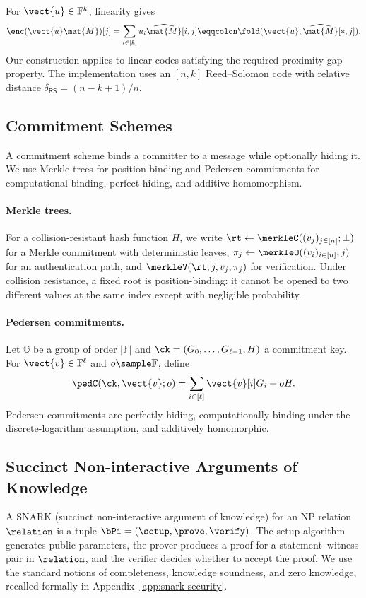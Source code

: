 For $\vect{u}\in\mathbb{F}^k$, linearity gives
\[
  \enc(\vect{u}\mat{M})[j]
  =\sum_{i\in[k]}u_i\widehat{\mat{M}}[i,j]
  \eqqcolon\fold(\vect{u},\widehat{\mat{M}}[*,j]).
\]
Our construction applies to linear codes satisfying the required proximity-gap
property.  The implementation uses an $[n,k]$ Reed--Solomon code with relative
distance $\delta_{\mathsf{RS}}=(n-k+1)/n$.

\subsection{Commitment Schemes}
\label{sec:prelim-commitments}

A commitment scheme binds a committer to a message while optionally hiding it.
We use Merkle trees for position binding and Pedersen commitments for
computational binding, perfect hiding, and additive homomorphism.

\paragraph{Merkle trees.}
For a collision-resistant hash function $H$, we write
$\rt\gets\merkleC((v_j)_{j\in[n]};\bot)$ for a Merkle commitment with
deterministic leaves, $\pi_j\gets\merkleO((v_i)_{i\in[n]},j)$ for an
authentication path, and $\merkleV(\rt,j,v_j,\pi_j)$ for verification.  Under
collision resistance, a fixed root is position-binding: it cannot be opened to
two different values at the same index except with negligible probability.

\paragraph{Pedersen commitments.}
Let $\mathbb{G}$ be a group of order $|\mathbb{F}|$ and
$\ck=(G_0,\ldots,G_{\ell-1},H)$ a commitment key.  For
$\vect{v}\in\mathbb{F}^{\ell}$ and $o\sample\mathbb{F}$, define
\[
  \pedC(\ck,\vect{v};o)
  =\sum_{i\in[\ell]}\vect{v}[i]G_i+oH.
\]
Pedersen commitments are perfectly hiding, computationally binding under the
discrete-logarithm assumption, and additively homomorphic.


\subsection{Succinct Non-interactive Arguments of Knowledge}
\label{sec:prelim-snark}

A SNARK (succinct non-interactive argument of knowledge) for an NP relation
$\relation$ is a tuple $\bPi=(\setup,\prove,\verify)$. The setup algorithm
generates public parameters, the prover produces a proof for a
statement--witness pair in $\relation$, and the verifier decides whether to
accept the proof. We use the standard notions of completeness, knowledge
soundness, and zero knowledge, recalled formally in
Appendix~\ref{app:snark-security}.


